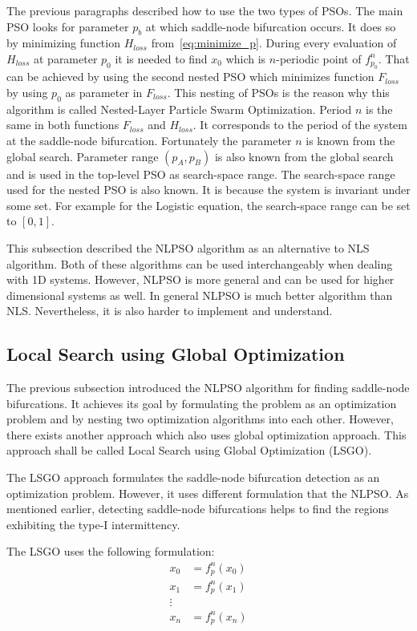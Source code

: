 \par
The previous paragraphs described how to use the two types of PSOs.
The main PSO looks for parameter $p_b$ at which saddle-node bifurcation occurs.
It does so by minimizing function $H_{loss}$ from~\eqref{eq:minimize_p}.
During every evaluation of $H_{loss}$ at parameter $p_0$ it is needed to find $x_0$ which is $n$-periodic point of $f^{n}_{p_0}$.
That can be achieved by using the second nested PSO which minimizes function $F_{loss}$ by using $p_0$ as parameter in $F_{loss}$.
This nesting of PSOs is the reason why this algorithm is called Nested-Layer Particle Swarm Optimization.
Period $n$ is the same in both functions $F_{loss}$ and $H_{loss}$.
It corresponds to the period of the system at the saddle-node bifurcation.
Fortunately the parameter $n$ is known from the global search.
Parameter range $(p_A, p_B)$ is also known from the global search and is used in the top-level PSO as search-space range.
The search-space range used for the nested PSO is also known.
It is because the system is invariant under some set.
For example for the Logistic equation, the search-space range can be set to $[0, 1]$.
\par
This subsection described the NLPSO algorithm as an alternative to NLS algorithm.
Both of these algorithms can be used interchangeably when dealing with 1D systems.
However, NLPSO is more general and can be used for higher dimensional systems as well.
In general NLPSO is much better algorithm than NLS.
Nevertheless, it is also harder to implement and understand.

\subsection{Local Search using Global Optimization}
The previous subsection introduced the NLPSO algorithm for finding saddle-node bifurcations.
It achieves its goal by formulating the problem as an optimization problem and by nesting two optimization algorithms into each other.
However, there exists another approach which also uses global optimization approach.
This approach shall be called Local Search using Global Optimization (LSGO).
\par
The LSGO approach formulates the saddle-node bifurcation detection as an optimization problem.
However, it uses different formulation that the NLPSO.
As mentioned earlier, detecting saddle-node bifurcations helps to find the regions exhibiting the type-I intermittency.
\par
The LSGO uses the following formulation:
\begin{align*} 
x_0 &= f_{p}^{n}(x_0)\\
x_1 &= f_{p}^{n}(x_1)\\
\vdots \\
x_n &= f_{p}^{n}(x_n)\\
\end{align*}

